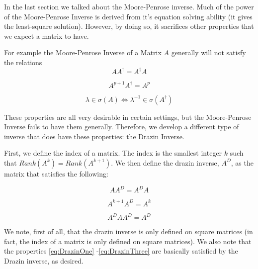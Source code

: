 

In the last section we talked about the Moore-Penrose inverse. Much of the power of the Moore-Penrose Inverse is derived from it's equation solving ability (it gives the least-square solution). However, by doing so, it sacrifices other properties that we expect a matrix to have.

For example the Moore-Penrose Inverse of a Matrix $A$ generally will not satisfy the relations
\begin{equation} \label{eq:DrazinOne}
A A^\dagger = A^\dagger A
\end{equation}

\begin{equation} \label{eq:DrazinTwo}
A^{p+1} A^\dagger = A^p
\end{equation}

\begin{equation} \label{eq:DrazinThree}
\lambda \in \sigma(A) \iff \lambda^{-1} \in \sigma(A^\dagger)
\end{equation}

These properties are all very desirable in certain settings, but the Moore-Penrose Inverse fails to have them generally. Therefore, we develop a different type of inverse that does have these properties: the Drazin Inverse.

First, we define the index of a matrix. The index is the smallest integer $k$ such that $Rank(A^k) = Rank(A^{k+1})$. We then define the drazin inverse, $A^D$, as the matrix that satisfies the following:

\begin{equation} \label{eq:DrazinCondOne}
A A^D = A^D A
\end{equation}

\begin{equation} \label{eq:DrazinCondTwo}
A^{k+1} A^D = A^k
\end{equation}

\begin{equation} \label{eq:DrazinCondThree}
A^D A A^D = A^D
\end{equation}

We note, first of all, that the drazin inverse is only defined on square matrices (in fact, the index of a matrix is only defined on square matrices). We also note that the properties \ref{eq:DrazinOne} -\ref{eq:DrazinThree} are basically satisfied by the Drazin inverse, as desired.

